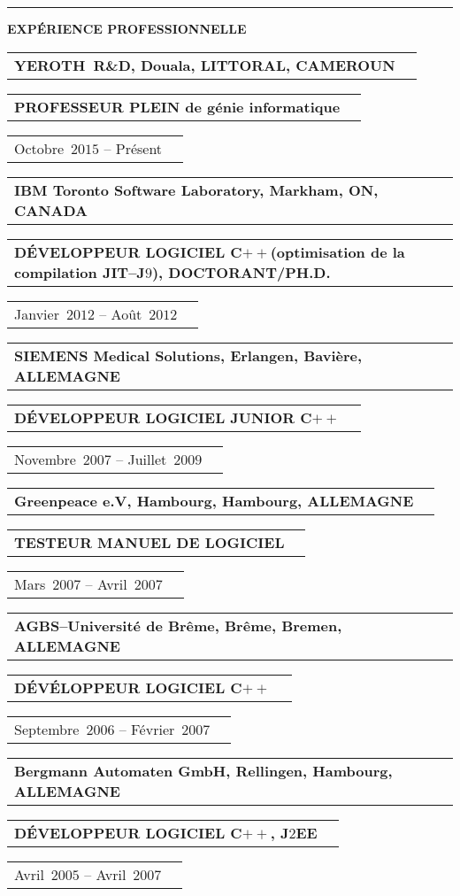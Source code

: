 \documentclass[9pt,a4paper]{article} %
\makeatletter
\newcommand{\headerrow}[2]
{\begin{tabular*}{\linewidth}{l@{\extracolsep{\fill}}r}
	#1 &
	#2 \\
\end{tabular*}}
\newcommand{\jtwoee}{J$2$EE\xspace}
\newcommand{\cplusplus}{C$++$\xspace}
\newcommand{\cvitemdate}[2]{#1~$#2$\xspace}
\newcommand{\cvitempositionheld}[1]{\textbf{#1}\xspace}
\makeatother
\begin{document}
\vspace{1em}


\hrule
\begin{center}
{\large \textbf{EXPÉRIENCE PROFESSIONNELLE}}
\end{center}

\vspace{0.5em}

\headerrow
	{\textbf{YEROTH~R\&D, Douala, LITTORAL, CAMEROUN}}
	{}
\headerrow
	{\cvitempositionheld{PROFESSEUR PLEIN de génie informatique}}
	{}
\headerrow
	{\cvitemdate{Octobre}{2015} -- Présent}	
	{}
	
\vspace{0.3em}

\headerrow
	{\textbf{IBM Toronto Software Laboratory, Markham, ON, CANADA}}	
	{}
\headerrow
	{\cvitempositionheld{DÉVELOPPEUR LOGICIEL \cplusplus (optimisation de la compilation JIT--J$9$), DOCTORANT/PH.D.}}
	{}
\headerrow
	{\cvitemdate{Janvier}{2012} -- \cvitemdate{Août}{2012}}	
	{}

\vspace{0.3em}

\headerrow
	{\textbf{SIEMENS Medical Solutions, Erlangen, Bavière, ALLEMAGNE}}	
	{}
\headerrow
	{\cvitempositionheld{DÉVELOPPEUR LOGICIEL JUNIOR \cplusplus}}
	{}
\headerrow
	{\cvitemdate{Novembre}{2007} -- \cvitemdate{Juillet}{2009}}	
	{}
	
\vspace{0.3em}

\headerrow
	{\textbf{Greenpeace e.V, Hambourg, Hambourg, ALLEMAGNE}}	
	{}
\headerrow
	{\cvitempositionheld{TESTEUR MANUEL DE LOGICIEL}}
	{}
\headerrow
	{\cvitemdate{Mars}{2007} -- \cvitemdate{Avril}{2007}}	
	{}	

\vspace{0.3em}

\headerrow
	{\textbf{AGBS--Université de Brême, Brême, Bremen, ALLEMAGNE}}	
	{}
\headerrow
	{\cvitempositionheld{DÉVÉLOPPEUR LOGICIEL \cplusplus}}
	{}
\headerrow
	{\cvitemdate{Septembre}{2006} -- \cvitemdate{Février}{2007}}	
	{}

\vspace{0.3em}

\headerrow
	{\textbf{Bergmann Automaten GmbH, Rellingen, Hambourg, ALLEMAGNE}}	
	{}
\headerrow
	{\cvitempositionheld{DÉVELOPPEUR LOGICIEL \cplusplus, \jtwoee}}
	{}
\headerrow
	{\cvitemdate{Avril}{2005} -- \cvitemdate{Avril}{2007}}	
	{}

\vspace{0.3em}
\end{document}
